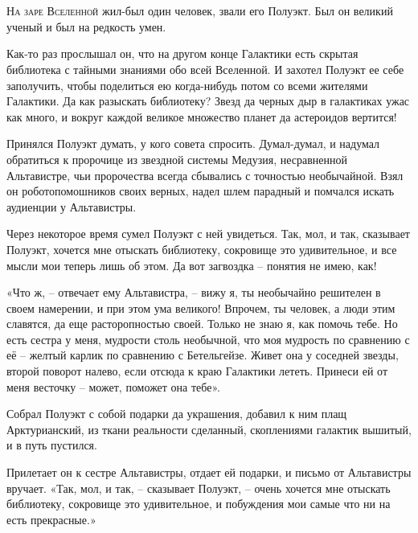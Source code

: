 \documentclass[ebook,oneside,final,openright]{memoir}
\begin{document}
\chapter{}
 \lettrine{Н}{а заре Вселенной} жил-был один человек, звали его Полуэкт. Был он великий ученый и был на редкость умен.\par
\par
Как-то раз прослышал он, что на другом конце Галактики есть скрытая библиотека с тайными знаниями обо всей Вселенной. И захотел Полуэкт ее себе заполучить, чтобы поделиться ею когда-нибудь потом со всеми жителями Галактики. Да как разыскать библиотеку? Звезд да черных дыр в галактиках ужас как много, и вокруг каждой великое множество планет да астероидов вертится!\par
\par
Принялся Полуэкт думать, у кого совета спросить. Думал-думал, и надумал обратиться к пророчице из звездной системы Медузия, несравненной Альтавистре, чьи пророчества всегда сбывались с точностью необычайной. Взял он роботопомошников своих верных, надел шлем парадный и помчался искать аудиенции у Альтавистры.\par
\par
Через некоторое время сумел Полуэкт с ней увидеться. Так, мол, и так, сказывает Полуэкт, хочется мне отыскать библиотеку, сокровище это удивительное, и все мысли мои теперь лишь об этом. Да вот загвоздка – понятия не имею, как!\par
\par
«Что ж, – отвечает ему Альтавистра, – вижу я, ты необычайно решителен в своем намерении, и при этом ума великого! Впрочем, ты человек, а люди этим славятся, да еще расторопностью своей. Только не знаю я, как помочь тебе. Но есть сестра у меня, мудрости столь необычной, что моя мудрость по сравнению с её – желтый карлик по сравнению с Бетельгейзе. Живет она у соседней звезды, второй поворот налево, если отсюда к краю Галактики лететь. Принеси ей от меня весточку – может, поможет она тебе».\par
\par
Собрал Полуэкт с собой подарки да украшения, добавил к ним плащ Арктурианский, из ткани реальности сделанный, скоплениями галактик вышитый, и в путь пустился.\par
\par
Прилетает он к сестре Альтавистры, отдает ей подарки, и письмо от Альтавистры вручает. «Так, мол, и так, – сказывает Полуэкт, – очень хочется мне отыскать библиотеку, сокровище это удивительное, и побуждения мои самые что ни на есть прекрасные.»\par
\end{document}
